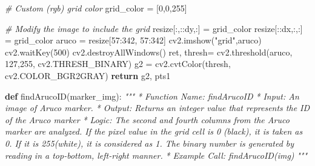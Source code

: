 \documentclass[]{article}
\newenvironment{Shaded}{}{}
\newcommand{\KeywordTok}[1]{\textcolor[rgb]{0.00,0.44,0.13}{\textbf{{#1}}}}
\newcommand{\DecValTok}[1]{\textcolor[rgb]{0.25,0.63,0.44}{{#1}}}
\newcommand{\StringTok}[1]{\textcolor[rgb]{0.25,0.44,0.63}{{#1}}}
\newcommand{\CommentTok}[1]{\textcolor[rgb]{0.38,0.63,0.69}{\textit{{#1}}}}
\newcommand{\ControlFlowTok}[1]{\textcolor[rgb]{0.00,0.44,0.13}{\textbf{{#1}}}}
\newcommand{\OperatorTok}[1]{\textcolor[rgb]{0.40,0.40,0.40}{{#1}}}
\newcommand{\NormalTok}[1]{{#1}}
\begin{document}
\begin{Shaded}
\begin{Highlighting}[]
    \CommentTok{# Custom (rgb) grid color}
    \NormalTok{grid_color }\OperatorTok{=} \NormalTok{[}\DecValTok{0}\NormalTok{,}\DecValTok{0}\NormalTok{,}\DecValTok{255}\NormalTok{]}

    \CommentTok{# Modify the image to include the grid}
    \NormalTok{resize[:,::dy,:] }\OperatorTok{=} \NormalTok{grid_color}
    \NormalTok{resize[::dx,:,:] }\OperatorTok{=} \NormalTok{grid_color}
    \NormalTok{aruco }\OperatorTok{=} \NormalTok{resize[}\DecValTok{57}\NormalTok{:}\DecValTok{342}\NormalTok{, }\DecValTok{57}\NormalTok{:}\DecValTok{342}\NormalTok{]}
    \NormalTok{cv2.imshow(}\StringTok{"grid"}\NormalTok{,aruco)}
    \NormalTok{cv2.waitKey(}\DecValTok{500}\NormalTok{)}
    \NormalTok{cv2.destroyAllWindows()}
    \NormalTok{ret, thresh}\OperatorTok{=} \NormalTok{cv2.threshold(aruco, }\DecValTok{127}\NormalTok{,}\DecValTok{255}\NormalTok{, cv2.THRESH_BINARY)}
    \NormalTok{g2 }\OperatorTok{=} \NormalTok{cv2.cvtColor(thresh, cv2.COLOR_BGR2GRAY)}
    \ControlFlowTok{return} \NormalTok{g2, pts1}

\KeywordTok{def} \NormalTok{findArucoID(marker_img):}
    \CommentTok{"""}
\CommentTok{    * Function Name:    findArucoID}
\CommentTok{    * Input:        An image of Aruco marker.}
\CommentTok{    * Output:       Returns an integer value that represents the ID of the}
\CommentTok{                        Aruco marker}
\CommentTok{    * Logic:        The second and fourth columns from the Aruco marker are}
\CommentTok{                        analyzed. If the pixel value in the grid cell is 0}
\CommentTok{                        (black), it is taken as 0. If it is 255(white), it is}
\CommentTok{                        considered as 1. The binary number is generated by}
\CommentTok{                        reading in a top-bottom, left-right manner.}
\CommentTok{    * Example Call: findArucoID(img)}
\CommentTok{    """}


\end{Highlighting}
\end{Shaded}
\end{document}
